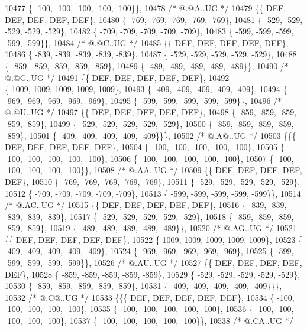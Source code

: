\begin{DoxyCode}
10477 \{ -100, -100, -100, -100, -100\}\},
10478 \textcolor{comment}{/*  @.@A..UG */}
10479 \{\{  DEF,  DEF,  DEF,  DEF,  DEF\},
10480 \{ -769, -769, -769, -769, -769\},
10481 \{ -529, -529, -529, -529, -529\},
10482 \{ -709, -709, -709, -709, -709\},
10483 \{ -599, -599, -599, -599, -599\}\},
10484 \textcolor{comment}{/*  @.@C..UG */}
10485 \{\{  DEF,  DEF,  DEF,  DEF,  DEF\},
10486 \{ -839, -839, -839, -839, -839\},
10487 \{ -529, -529, -529, -529, -529\},
10488 \{ -859, -859, -859, -859, -859\},
10489 \{ -489, -489, -489, -489, -489\}\},
10490 \textcolor{comment}{/*  @.@G..UG */}
10491 \{\{  DEF,  DEF,  DEF,  DEF,  DEF\},
10492 \{-1009,-1009,-1009,-1009,-1009\},
10493 \{ -409, -409, -409, -409, -409\},
10494 \{ -969, -969, -969, -969, -969\},
10495 \{ -599, -599, -599, -599, -599\}\},
10496 \textcolor{comment}{/*  @.@U..UG */}
10497 \{\{  DEF,  DEF,  DEF,  DEF,  DEF\},
10498 \{ -859, -859, -859, -859, -859\},
10499 \{ -529, -529, -529, -529, -529\},
10500 \{ -859, -859, -859, -859, -859\},
10501 \{ -409, -409, -409, -409, -409\}\}\},
10502 \textcolor{comment}{/*  @.A@..UG */}
10503 \{\{\{  DEF,  DEF,  DEF,  DEF,  DEF\},
10504 \{ -100, -100, -100, -100, -100\},
10505 \{ -100, -100, -100, -100, -100\},
10506 \{ -100, -100, -100, -100, -100\},
10507 \{ -100, -100, -100, -100, -100\}\},
10508 \textcolor{comment}{/*  @.AA..UG */}
10509 \{\{  DEF,  DEF,  DEF,  DEF,  DEF\},
10510 \{ -769, -769, -769, -769, -769\},
10511 \{ -529, -529, -529, -529, -529\},
10512 \{ -709, -709, -709, -709, -709\},
10513 \{ -599, -599, -599, -599, -599\}\},
10514 \textcolor{comment}{/*  @.AC..UG */}
10515 \{\{  DEF,  DEF,  DEF,  DEF,  DEF\},
10516 \{ -839, -839, -839, -839, -839\},
10517 \{ -529, -529, -529, -529, -529\},
10518 \{ -859, -859, -859, -859, -859\},
10519 \{ -489, -489, -489, -489, -489\}\},
10520 \textcolor{comment}{/*  @.AG..UG */}
10521 \{\{  DEF,  DEF,  DEF,  DEF,  DEF\},
10522 \{-1009,-1009,-1009,-1009,-1009\},
10523 \{ -409, -409, -409, -409, -409\},
10524 \{ -969, -969, -969, -969, -969\},
10525 \{ -599, -599, -599, -599, -599\}\},
10526 \textcolor{comment}{/*  @.AU..UG */}
10527 \{\{  DEF,  DEF,  DEF,  DEF,  DEF\},
10528 \{ -859, -859, -859, -859, -859\},
10529 \{ -529, -529, -529, -529, -529\},
10530 \{ -859, -859, -859, -859, -859\},
10531 \{ -409, -409, -409, -409, -409\}\}\},
10532 \textcolor{comment}{/*  @.C@..UG */}
10533 \{\{\{  DEF,  DEF,  DEF,  DEF,  DEF\},
10534 \{ -100, -100, -100, -100, -100\},
10535 \{ -100, -100, -100, -100, -100\},
10536 \{ -100, -100, -100, -100, -100\},
10537 \{ -100, -100, -100, -100, -100\}\},
10538 \textcolor{comment}{/*  @.CA..UG */}

\end{DoxyCode}
